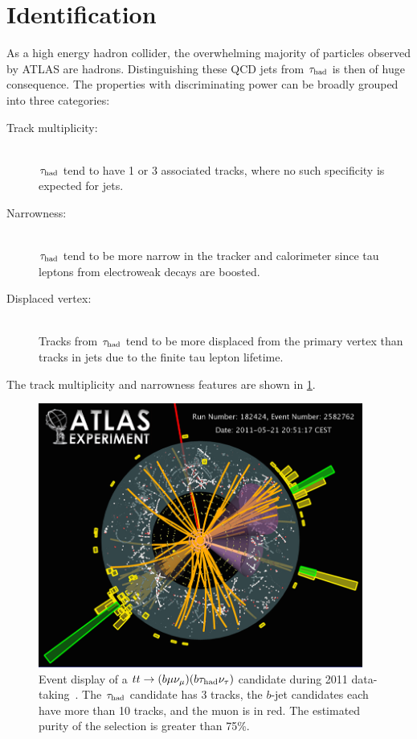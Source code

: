 \section{Identification}

As a high energy hadron collider, the overwhelming majority of particles observed by ATLAS are hadrons. Distinguishing these QCD jets from $\tau_\text{had}$ is then of huge consequence. The properties with discriminating power can be broadly grouped into three categories:
%
\begin{description}
    \item[Track multiplicity:] \hfill \\
      $\tau_\text{had}$ tend to have 1 or 3 associated tracks, where no such specificity is expected for jets.
    \item[Narrowness:]         \hfill \\
      $\tau_\text{had}$ tend to be more narrow in the tracker and calorimeter since tau leptons from electroweak decays are boosted.
    \item[Displaced vertex:]   \hfill \\
      Tracks from $\tau_\text{had}$ tend to be more displaced from the primary vertex than tracks in jets due to the finite tau lepton lifetime.
\end{description}
%
The track multiplicity and narrowness features are shown in \cref{fig:taus-eventdisplay}.

\begin{figure}[tp]
  \centering
  \includegraphics[width=0.95\textwidth]{figures/tauperformance/vp1_3dcocktail_run182424_evt2582762_tttaumu}
  \caption{Event display of a $tt \rightarrow (b\mu\nu_\mu)(b\tau_\text{had}\nu_\tau)$ candidate during 2011 data-taking~\cite{atlas-eventdisplays}. The $\tau_\text{had}$ candidate has 3 tracks, the $b$-jet candidates each have more than 10 tracks, and the muon is in red. The estimated purity of the selection is greater than 75\%.}
  \label{fig:taus-eventdisplay}
\end{figure}

